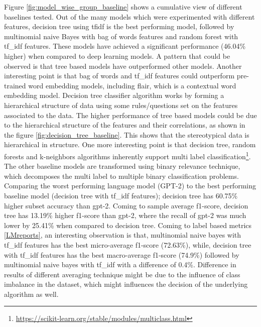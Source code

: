 Figure \ref{fig:model_wise_group_baseline} shows a cumulative view of different baselines tested. Out of the many models which were experimented with different features, decision tree using \acrshort{tfidf} is the best performing model, followed by multinomial naive Bayes with bag of words features and random forest with tf\_idf features. These models have achieved a significant performance (46.04\% higher) when compared to deep learning models. A pattern that could be observed is that tree based models have outperformed other models. Another interesting point is that bag of words and tf\_idf features could outperform pre-trained word embedding models, including flair, which is a contextual word embedding model. Decision tree classifier algorithm works by forming a hierarchical structure of data using some rules/questions set on the features associated to the data\cite{kingsford2008decision}. The higher performance of tree based models could be due to the hierarchical structure of the features and their correlations, as shown in the figure \ref{fig:decision_tree_baseline}. This shows that the stereotypical data is hierarchical in structure. One more interesting point is that decision tree, random forests and k-neighbors algorithms inherently support multi label classification\footnote{\url{https://scikit-learn.org/stable/modules/multiclass.html}}. The other baseline models are transformed using binary relevance technique, which decomposes the multi label to multiple binary classification problems. Comparing the worst performing language model (GPT-2) to the best performing baseline model (decision tree with tf\_idf features); decision tree has 60.75\% higher subset accuracy than gpt-2.  Coming to sample average f1-score, decision tree has 13.19\% higher f1-score than gpt-2, where the recall of gpt-2 was much lower by 25.41\% when compared to decision tree. Coming to label based metrics \ref{LMreports}, an interesting observation is that, multinomial naive bayes with tf\_idf features has the best micro-average f1-score (72.63\%), while, decision tree with tf\_idf features has the best macro-average f1-score (74.9\%) followed by multinomial naive bayes with tf\_idf with a difference of 0.4\%. Difference in results of different averaging technique might be due to the influence of class imbalance in the dataset, which might influences the decision of the underlying algorithm as well. 
\pagebreak
 

